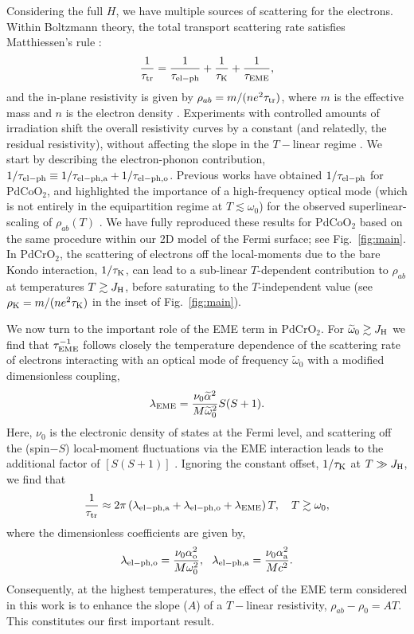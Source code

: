 \documentclass[aps,prl,twocolumn,superscriptaddress,amsmath,nofootinbib,10pt,floatfix]{revtex4-2}
\def \beq {\begin{eqnarray}}
\def \eeq {\end{eqnarray}}
\begin{document}
Considering the full $H$, we have multiple sources of scattering for the electrons. Within Boltzmann theory, the total transport scattering rate satisfies Matthiessen's rule \cite{Ziman_2001}: 
\begin{eqnarray}
\frac{1}{\tau_{\rm tr}} = \frac{1}{\tau_{\rm{el-ph}}} + \frac{1}{\tau_{\rm K}} + \frac{1}{\tau_{\rm EME}},
\label{tr_time}
\end{eqnarray}
and the in-plane resistivity is given by $\rho_{ab} = m/(ne^2 \tau_{\rm tr})$, where $m$ is the effective mass and $n$ is the electron density \cite{Supplementary_material}. Experiments with controlled amounts of irradiation shift the overall resistivity curves by a constant (and relatedly, the residual resistivity), without affecting the slope in the $T-$linear regime \cite{Zhakina2023}.  We start by describing the electron-phonon contribution, $1/\tau_{\rm{el-ph}}\equiv 1/\tau_{\rm{el-ph},a}+1/\tau_{\rm{el-ph},o}$.  
Previous works have obtained $1/\tau_{\rm{el-ph}}$ for PdCoO$_2$, and highlighted the importance of a high-frequency optical mode (which is not entirely in the equipartition regime at $T\lesssim \omega_0$) for the observed superlinear-scaling of $\rho_{ab}(T)$ \cite{takatsu_roles_2007,Hicks_mobility_2012}. We have fully reproduced these results for PdCoO$_2$ based on the same procedure \cite{Supplementary_material} within our 2D  model of the Fermi surface; see Fig.~\ref{fig:main}. In PdCrO$_2$, the scattering of electrons off the local-moments due to the bare Kondo interaction, $1/\tau_{\rm K}$, can lead to a sub-linear $T$-dependent contribution to $\rho_{ab}$ at temperatures $T \gtrsim J_{\rm H}$, before saturating to the $T$-independent value \cite{mcroberts2022intermediatescale} (see $\rho_{\rm K}=m/(ne^2 \tau_{\rm K})$ in the inset of Fig.~\ref{fig:main}).


We now turn to the important role of the EME term in PdCrO$_2$. For $\widetilde{\omega}_0\gtrsim J_{\rm{H}}$  we find that $\tau_{{\rm EME}}^{-1}$ follows closely the temperature dependence of the scattering rate of electrons interacting with an optical mode of frequency $\widetilde{\omega}_0$ with a modified dimensionless coupling, 
 \beq
\lambda_{\rm EME} = \frac{\nu_0 \widetilde{\alpha}^2}{{M}\widetilde{\omega}_0^2}S(S+1).
\label{lambdaeph}
\eeq
Here, $\nu_0$ is the electronic density of states at the Fermi level, and scattering off the (spin$-S$) local-moment fluctuations via the EME interaction leads to the additional factor of $[S(S+1)]$ \cite{Supplementary_material}. Ignoring the constant offset, $1/\tau_{\rm K}$ at $T\gg J_{\rm{H}}$, we find that
\begin{equation}
    \frac{1}{\tau_{\rm tr}} \approx 2\pi\left(\lambda_{\rm{el-ph, a}} +\lambda_{\rm{el-ph, o}} + \lambda_{\rm EME}\right) T,\quad T\gtrsim \omega_0,
    \label{slope_w_EME}
\end{equation}
where the dimensionless coefficients are given by,
\beq
\lambda_{\rm{el-ph,o}} = \frac{\nu_0\alpha^2_{\rm{o}}}{M\omega_0^2},~~\lambda_{\rm{el-ph,a}} = \frac{\nu_0\alpha^2_{\rm{a}}}{Mc^2}.
\label{lambdaeph}
\eeq
Consequently, at the highest temperatures, the effect of the EME term considered in this work is to enhance the slope ($A$) of a $T-$linear resistivity, $\rho_{ab}-\rho_0=AT$. This constitutes our first important result. 
\end{document}
